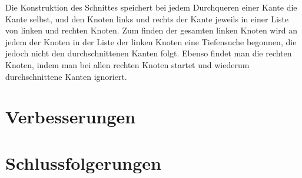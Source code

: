 \documentclass[a4paper]{scrreprt}
\theoremstyle{definition}
\begin{document}
Die Konstruktion des Schnittes speichert bei jedem Durchqueren einer Kante die Kante selbst, und den Knoten links und rechts der Kante jeweils in einer Liste von linken und rechten Knoten. Zum finden der gesamten linken Knoten wird an jedem der Knoten in der Liste der linken Knoten eine Tiefensuche begonnen, die jedoch nicht den durchschnittenen Kanten folgt. Ebenso findet man die rechten Knoten, indem man bei allen rechten Knoten startet und wiederum durchschnittene Kanten ignoriert.

\chapter{Verbesserungen}





\chapter{Schlussfolgerungen}








\end{document}
